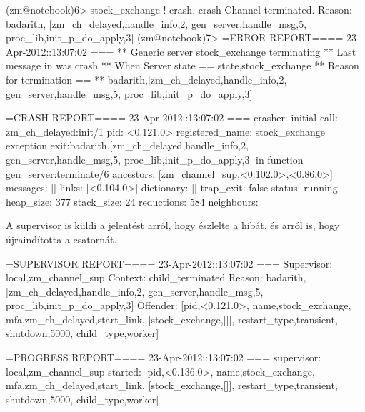 \documentclass[12pt, a4paper, oneside]{book}
\begin{document}
\begin{code}{}{}
(zm@notebook)6> stock_exchange ! crash.                                          
crash
Channel terminated. Reason: {badarith,
    [{zm_ch_delayed,handle_info,2},
    {gen_server,handle_msg,5},
    {proc_lib,init_p_do_apply,3}]}
(zm@notebook)7> 
=ERROR REPORT==== 23-Apr-2012::13:07:02 ===
** Generic server stock_exchange terminating 
** Last message in was crash
** When Server state == {state,stock_exchange}
** Reason for termination == 
** {badarith,[{zm_ch_delayed,handle_info,2},
              {gen_server,handle_msg,5},
              {proc_lib,init_p_do_apply,3}]}

=CRASH REPORT==== 23-Apr-2012::13:07:02 ===
 crasher:
  initial call: zm_ch_delayed:init/1
  pid: <0.121.0>
  registered_name: stock_exchange
  exception exit:{badarith,[{zm_ch_delayed,handle_info,2},
                            {gen_server,handle_msg,5},
                            {proc_lib,init_p_do_apply,3}]}
  in function  gen_server:terminate/6
  ancestors: [zm_channel_sup,<0.102.0>,<0.86.0>]
  messages: []
  links: [<0.104.0>]
  dictionary: []
  trap_exit: false
  status: running
  heap_size: 377
  stack_size: 24
  reductions: 584
 neighbours:
\end{code}

A supervisor is küldi a jelentést arról, hogy észlelte a hibát, és arról is,
hogy újraindította a csatornát.

\begin{code}{}{}
=SUPERVISOR REPORT==== 23-Apr-2012::13:07:02 ===
     Supervisor: {local,zm_channel_sup}
     Context:    child_terminated
     Reason:     {badarith,[{zm_ch_delayed,handle_info,2},
                            {gen_server,handle_msg,5},
                            {proc_lib,init_p_do_apply,3}]}
     Offender:   [{pid,<0.121.0>},
                  {name,stock_exchange},
                  {mfa,{zm_ch_delayed,start_link,
                        [stock_exchange,[]]}},
                  {restart_type,transient},
                  {shutdown,5000},
                  {child_type,worker}]


=PROGRESS REPORT==== 23-Apr-2012::13:07:02 ===
          supervisor: {local,zm_channel_sup}
             started: [{pid,<0.136.0>},
                       {name,stock_exchange},
                       {mfa,{zm_ch_delayed,start_link,
                            [stock_exchange,[]]}},
                       {restart_type,transient},
                       {shutdown,5000},
                       {child_type,worker}]
\end{code}
\end{document}
